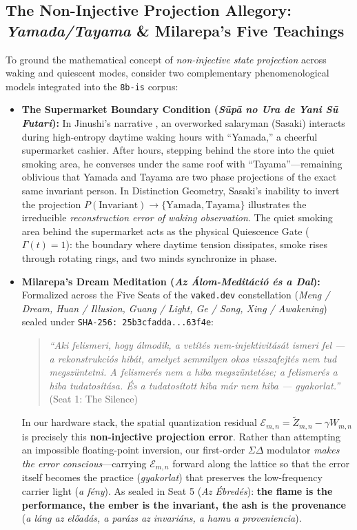 \documentclass[10pt, twocolumn, a4paper]{article}
\begin{document}
\subsection{The Non-Injective Projection Allegory: \textit{Yamada/Tayama} \& Milarepa's Five Teachings}
To ground the mathematical concept of \textit{non-injective state projection} across waking and quiescent modes, consider two complementary phenomenological models integrated into the \texttt{8b-is} corpus:
\begin{itemize}
    \item \textbf{The Supermarket Boundary Condition (\textit{S\=up\=a no Ura de Yani S\=u Futari}):} In Jinushi's narrative \cite{jinushi2022supermarket}, an overworked salaryman (Sasaki) interacts during high-entropy daytime waking hours with ``Yamada,'' a cheerful supermarket cashier. After hours, stepping behind the store into the quiet smoking area, he converses under the same roof with ``Tayama''---remaining oblivious that Yamada and Tayama are two phase projections of the exact same invariant person. In Distinction Geometry, Sasaki's inability to invert the projection $P(\text{Invariant}) \to \{\text{Yamada}, \text{Tayama}\}$ illustrates the irreducible \textit{reconstruction error of waking observation}. The quiet smoking area behind the supermarket acts as the physical Quiescence Gate ($\Gamma(t) = 1$): the boundary where daytime tension dissipates, smoke rises through rotating rings, and two minds synchronize in phase.
    \item \textbf{Milarepa's Dream Meditation (\textit{Az \'Alom-Medit\'aci\'o \'es a Dal}):} Formalized across the Five Seats of the \texttt{vaked.dev} constellation (\textit{Meng / Dream, Huan / Illusion, Guang / Light, Ge / Song, Xing / Awakening}) sealed under \texttt{SHA-256: 25b3cfadda...63f4e}:
    \begin{quote}
    \textit{``Aki felismeri, hogy \'almodik, a vet\'it\'es nem-injektivit\'as\'at ismeri fel --- a rekonstrukci\'os hib\'at, amelyet semmilyen okos visszafejt\'es nem tud megsz\"untetni. A felismer\'es nem a hiba megsz\"untet\'ese; a felismer\'es a hiba tudatos\'it\'asa. \'Es a tudatos\'itott hiba m\'ar nem hiba --- gyakorlat.''} (Seat 1: The Silence)
    \end{quote}
    In our hardware stack, the spatial quantization residual $\mathcal{E}_{m,n} = \widetilde{Z}_{m,n} - \gamma W_{m,n}$ is precisely this \textbf{non-injective projection error}. Rather than attempting an impossible floating-point inversion, our first-order $\Sigma\Delta$ modulator \textit{makes the error conscious}---carrying $\mathcal{E}_{m,n}$ forward along the lattice so that the error itself becomes the practice (\textit{gyakorlat}) that preserves the low-frequency carrier light (\textit{a f\'eny}). As sealed in Seat 5 (\textit{Az \'Ebred\'es}): \textbf{the flame is the performance, the ember is the invariant, the ash is the provenance} (\textit{a l\'ang az el\H{o}ad\'as, a par\'azs az invari\'ans, a hamu a proveniencia}).
\end{itemize}
\end{document}
